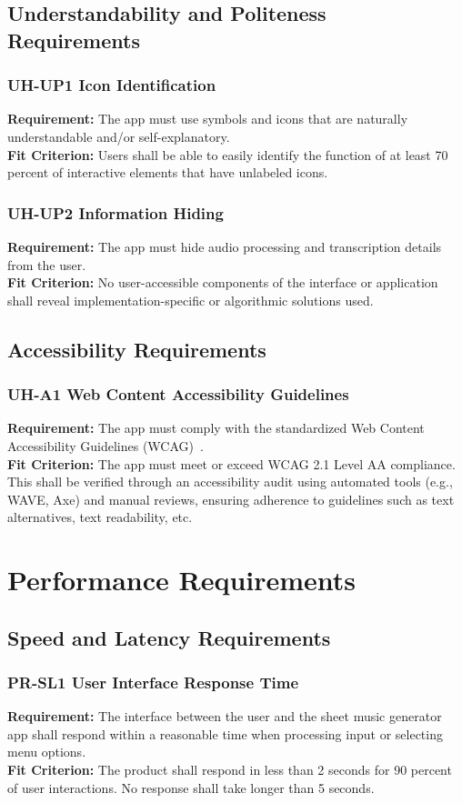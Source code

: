\documentclass[12pt]{article}
\begin{document}
\subsection{Understandability and Politeness Requirements}
\subsubsection*{UH-UP1 Icon Identification}
\textbf{Requirement:} The app must use symbols and icons that are naturally understandable and/or self-explanatory.\\
\textbf{Fit Criterion:} Users shall be able to easily identify the function of at least 70 percent of interactive elements
that have unlabeled icons.
\subsubsection*{UH-UP2 Information Hiding}
\textbf{Requirement:} The app must hide audio processing and transcription details from the user.\\
\textbf{Fit Criterion:} No user-accessible components of the interface or application shall reveal
implementation-specific or algorithmic solutions used.
\subsection{Accessibility Requirements}
\subsubsection*{UH-A1 Web Content Accessibility Guidelines}
\textbf{Requirement:} The app must comply with the standardized Web Content Accessibility Guidelines (WCAG)~\cite{WCAG21}.\\
\textbf{Fit Criterion:} The app must meet or exceed WCAG 2.1 Level AA compliance. This shall be verified through 
an accessibility audit using automated tools (e.g., WAVE, Axe) and manual reviews, ensuring adherence to guidelines 
such as text alternatives, text readability, etc.
\section{Performance Requirements}
\subsection{Speed and Latency Requirements}
\subsubsection*{PR-SL1 User Interface Response Time}
\textbf{Requirement:} The interface between the user and the sheet music generator app shall respond within a reasonable time when processing input or selecting menu options.\\
\textbf{Fit Criterion:} The product shall respond in less than 2 seconds for 90 percent of user interactions. No response shall take longer than 5 seconds.
\end{document}
